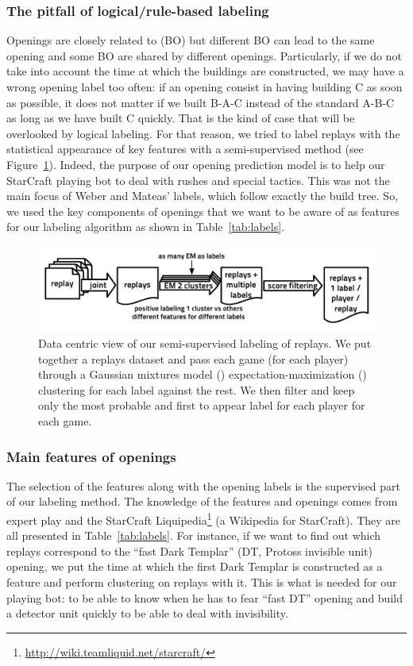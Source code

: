 \subsubsection{The pitfall of logical/rule-based labeling}
Openings are closely related to  (BO) but different BO can lead to the same opening and some BO are shared by different openings. Particularly, if we do not take into account the time at which the buildings are constructed, we may have a wrong opening label too often: if an opening consist in having building C as soon as possible, it does not matter if we built B-A-C instead of the standard A-B-C as long as we have built C quickly. That is the kind of case that will be overlooked by logical labeling. For that reason, we tried to label replays with the statistical appearance of key features with a semi-supervised method (see Figure~\ref{fig:replays_labeling}). Indeed, the purpose of our opening prediction model is to help our StarCraft playing bot to deal with rushes and special tactics. This was not the main focus of Weber and Mateas' labels, which follow exactly the build tree. So, we used the key components of openings that we want to be aware of as features for our labeling algorithm as shown in Table~\ref{tab:labels}.

\begin{figure}[h]
\centerline{\includegraphics[width=0.80\columnwidth]{images/replays_labeling.pdf}}
\caption{Data centric view of our semi-supervised labeling of replays. 
We put together a replays dataset and pass each game (for each player) through a Gaussian mixtures model () expectation-maximization () clustering for each label against the rest. We then filter and keep only the most probable and first to appear  label for each player for each game.}
\label{fig:replays_labeling}
\end{figure}

\subsubsection{Main features of openings}

The selection of the features along with the opening labels is the supervised part of our labeling method. The knowledge of the features and openings comes from expert play and the StarCraft Liquipedia\footnote{\url{http://wiki.teamliquid.net/starcraft/}} (a Wikipedia for StarCraft). They are all presented in Table~\ref{tab:labels}. For instance, if we want to find out which replays correspond to the ``fast Dark Templar'' (DT, Protoss invisible unit) opening, we put the time at which the first Dark Templar is constructed as a feature and perform clustering on replays with it. This is what is needed for our playing bot: to be able to know when he has to fear ``fast DT'' opening and build a detector unit quickly to be able to deal with invisibility.

